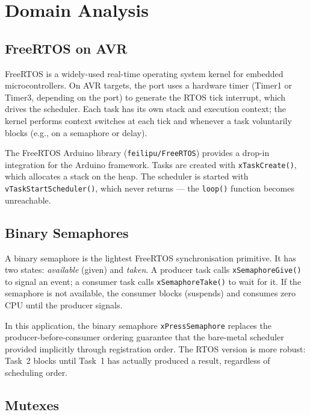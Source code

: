 \documentclass[12pt]{article}
\begin{document}
\section{Domain Analysis}

\subsection{FreeRTOS on AVR}

FreeRTOS is a widely-used real-time operating system kernel for embedded microcontrollers. On AVR targets, the port uses a hardware timer (Timer1 or Timer3, depending on the port) to generate the RTOS tick interrupt, which drives the scheduler. Each task has its own stack and execution context; the kernel performs context switches at each tick and whenever a task voluntarily blocks (e.g., on a semaphore or delay).

The FreeRTOS Arduino library (\texttt{feilipu/FreeRTOS}) provides a drop-in integration for the Arduino framework. Tasks are created with \texttt{xTaskCreate()}, which allocates a stack on the heap. The scheduler is started with \texttt{vTaskStartScheduler()}, which never returns — the \texttt{loop()} function becomes unreachable. \cite{freertos_sem}

\subsection{Binary Semaphores}

A binary semaphore is the lightest FreeRTOS synchronisation primitive. It has two states: \emph{available} (given) and \emph{taken}. A producer task calls \texttt{xSemaphoreGive()} to signal an event; a consumer task calls \texttt{xSemaphoreTake()} to wait for it. If the semaphore is not available, the consumer blocks (suspends) and consumes zero CPU until the producer signals.

In this application, the binary semaphore \texttt{xPressSemaphore} replaces the producer-before-consumer ordering guarantee that the bare-metal scheduler provided implicitly through registration order. The RTOS version is more robust: Task~2 blocks until Task~1 has actually produced a result, regardless of scheduling order. \cite{freertos_sem}

\subsection{Mutexes}
\end{document}
